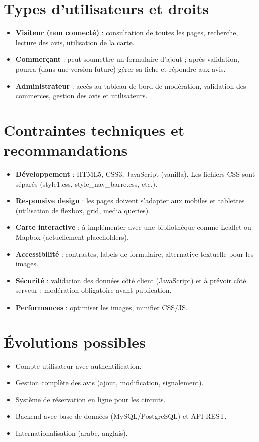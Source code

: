 \documentclass[a4paper,12pt]{article}
\begin{document}
\section{Types d’utilisateurs et droits}
\begin{itemize}
    \item \textbf{Visiteur (non connecté)} : consultation de toutes les pages, recherche, lecture des avis, utilisation de la carte.
    \item \textbf{Commerçant} : peut soumettre un formulaire d’ajout ; après validation, pourra (dans une version future) gérer sa fiche et répondre aux avis.
    \item \textbf{Administrateur} : accès au tableau de bord de modération, validation des commerces, gestion des avis et utilisateurs.
\end{itemize}

\section{Contraintes techniques et recommandations}
\begin{itemize}
    \item \textbf{Développement} : HTML5, CSS3, JavaScript (vanilla). Les fichiers CSS sont séparés (style1.css, style\_nav\_barre.css, etc.).
    \item \textbf{Responsive design} : les pages doivent s’adapter aux mobiles et tablettes (utilisation de flexbox, grid, media queries).
    \item \textbf{Carte interactive} : à implémenter avec une bibliothèque comme Leaflet ou Mapbox (actuellement placeholders).
    \item \textbf{Accessibilité} : contrastes, labels de formulaire, alternative textuelle pour les images.
    \item \textbf{Sécurité} : validation des données côté client (JavaScript) et à prévoir côté serveur ; modération obligatoire avant publication.
    \item \textbf{Performances} : optimiser les images, minifier CSS/JS.
\end{itemize}

\section{Évolutions possibles}
\begin{itemize}
    \item Compte utilisateur avec authentification.
    \item Gestion complète des avis (ajout, modification, signalement).
    \item Système de réservation en ligne pour les circuits.
    \item Backend avec base de données (MySQL/PostgreSQL) et API REST.
    \item Internationalisation (arabe, anglais).
\end{itemize}
\end{document}
